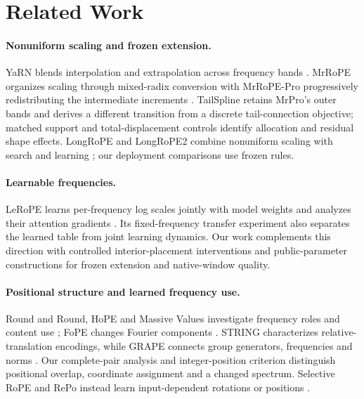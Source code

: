 \section{Related Work}
\label{sec:related}
\paragraph{Nonuniform scaling and frozen extension.}
YaRN blends interpolation and extrapolation across frequency bands
\citep{peng2024yarn}. MrRoPE organizes scaling through mixed-radix conversion
with MrRoPE-Pro progressively
redistributing the intermediate increments \citep{tian2026mrrope}. TailSpline retains MrPro's outer bands and derives
a different transition from a discrete tail-connection objective; matched
support and total-displacement controls identify allocation and residual shape
effects. LongRoPE and LongRoPE2 combine nonuniform scaling with search and
learning \citep{ding2024longrope,shang2025longrope2}; our deployment comparisons use frozen rules.

\paragraph{Learnable frequencies.}
LeRoPE learns per-frequency log scales jointly with model weights and analyzes
their attention gradients \citep{karypis2026lerope}. Its fixed-frequency
transfer experiment also separates the learned table from joint learning
dynamics. Our work complements this direction with controlled interior-placement
interventions and public-parameter constructions for frozen extension and
native-window quality.

\paragraph{Positional structure and learned frequency use.}
Round and Round, HoPE and Massive Values investigate frequency roles and
content use \citep{barbero2025round,chen2025hope,jin2025massive}; FoPE changes
Fourier components \citep{hua2025fope}. STRING characterizes relative-translation
encodings, while GRAPE connects group generators, frequencies and norms
\citep{schenck2025string,zhang2026grape}. Our complete-pair analysis and
integer-position criterion distinguish positional overlap, coordinate assignment
and a changed spectrum. Selective RoPE and RePo instead learn input-dependent
rotations or positions \citep{movahedi2026selectiverope,li2026repo}.
